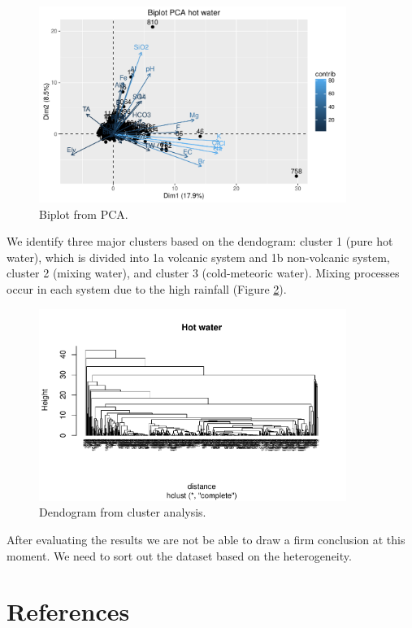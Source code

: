 \documentclass{sciposter}
\begin{document}
\begin{multicols}{3}
\begin{figure}[h]
\begin{center}
\includegraphics[width=10cm]{pca_x.pdf}
\end{center}
\caption{ \label{fig:pca} Biplot from PCA. }
\end{figure}

We identify three major clusters based on the dendogram: cluster 1 (pure hot water), which is divided into 1a volcanic system and 1b non-volcanic system, cluster 2 (mixing water), and cluster 3 (cold-meteoric water). Mixing processes occur in each system due to the high rainfall (Figure \ref{fig:cluster}).

\begin{figure}[h]
\begin{center}
\includegraphics[width=10cm]{cluster_x.pdf}
\end{center}
\caption{ \label{fig:cluster} Dendogram from cluster analysis. }
\end{figure}

After evaluating the results we are not be able to draw a firm conclusion at this moment. We need to sort out the dataset based on the heterogeneity. 

 
\section{References}


\end{multicols}
\end{document}
